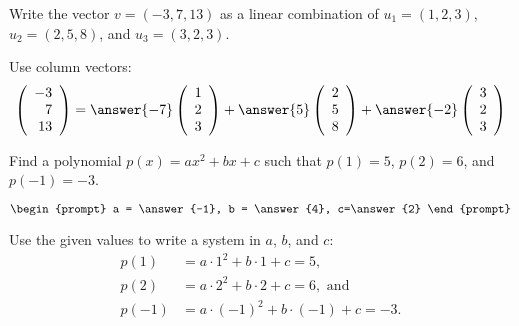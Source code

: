 \documentclass{ximera}
\begin{document}
\begin{exercise}

\noindent Write the vector $v=(-3,7,13)$ as a linear combination of $u_1=(1,2,3)$, $u_2=(2,5,8)$, and $u_3=(3,2,3)$.  

\begin{prompt}
Use column vectors: 
\[
\left(\begin{array}{r} -3 \\ 7 \\ 13 \end{array} \right) 
= \answer{-7}\left(\begin{array}{r} 1 \\ 2 \\ 3 \end{array} \right) 
+ \answer{5}\left(\begin{array}{r} 2 \\ 5 \\ 8 \end{array} \right) 
+ \answer{-2}\left(\begin{array}{r} 3 \\ 2 \\ 3 \end{array} \right)
\]
\end{prompt}

\end{exercise}

\problemlabel

\noindent Find a polynomial $p(x) = ax^2+bx+c$ such that $p(1)=5$, $p(2)=6$, and $p(-1)=-3$.    


\begin{exercise}

$\begin{prompt}
a = \answer{-1}, b = \answer{4}, c=\answer{2}
\end{prompt}$

\begin{hint}
Use the given values to write a system in $a$, $b$, and $c$: 
\begin{align*}
p(1) &= a\cdot 1^2+b\cdot 1 + c =5, \\
p(2) &= a\cdot 2^2+b\cdot 2 + c =6,\textrm{ and} \\
p(-1) &= a\cdot(-1)^2+b\cdot(-1) + c =-3.
\end{align*}
\end{hint}

\end{exercise}
\end{document}
